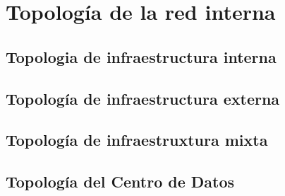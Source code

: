 \section{Topología de la red interna}

\subsection{Topologia de infraestructura interna}
\subsection{Topología de infraestructura externa}
\subsection{Topología de infraestruxtura mixta}
\subsection{Topología del Centro de Datos} 